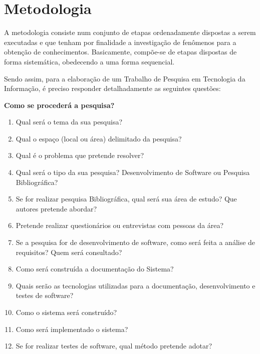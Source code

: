 \chapter{Metodologia}  \label{cap:04}

A metodologia consiste num conjunto de etapas ordenadamente dispostas a serem executadas e que tenham por finalidade a investigação de fenômenos para a obtenção de conhecimentos. Basicamente, compõe-se de etapas dispostas de forma sistemática, obedecendo a uma forma sequencial. 

Sendo assim, para a elaboração de um Trabalho de Pesquisa em Tecnologia da Informação, é preciso responder detalhadamente as seguintes questões:

\vspace{0.5cm}

\textbf{Como se procederá a pesquisa?}

\begin{enumerate}
    \item Qual será o tema da sua pesquisa? 
    \item Qual o espaço (local ou área) delimitado da pesquisa? 
    \item Qual é o problema que pretende resolver?
    \item Qual será o tipo da sua pesquisa? Desenvolvimento de Software ou Pesquisa Bibliográfica?
    \item Se for realizar pesquisa Bibliográfica, qual será sua área de estudo? Que autores pretende abordar?
    \item Pretende realizar questionários ou entrevistas com pessoas da área?
    \item Se a pesquisa for de desenvolvimento de software, como será feita a análise de requisitos? Quem será consultado? 
    \item Como será construída a documentação do Sistema?
    \item Quais serão as tecnologias utilizadas para a documentação, desenvolvimento e testes de software?
    \item Como o sistema será construído?
    \item Como será implementado o sistema?
    \item Se for realizar testes de software, qual método pretende adotar?
\end{enumerate}
